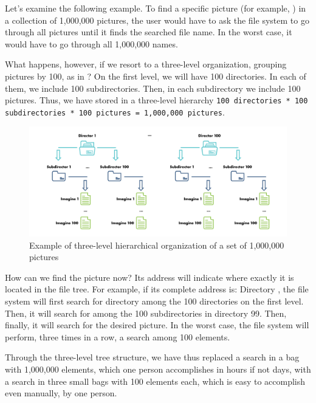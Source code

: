 Let's examine the following example.
To find a specific picture (for example, ) in a collection of 1,000,000 pictures, the user would have to ask the file system to go through all pictures until it finds the searched file name.
In the worst case, it would have to go through all 1,000,000 names.

What happens, however, if we resort to a three-level organization, grouping pictures by 100, as in ? On the first level, we will have 100 directories.
In each of them, we include 100 subdirectories.
Then, in each subdirectory we include 100 pictures.
Thus, we have stored in a three-level hierarchy \texttt{100 directories * 100 subdirectories * 100 pictures = 1,000,000 pictures}.

\begin{figure}[htbp]
  \centering
  \includegraphics[width=\columnwidth]{chapters/03-data-files/img/3-lvl-fs.pdf}
  \caption{Example of three-level hierarchical organization of a set of 1,000,000 pictures}
  \label{fig:data-files:ex-3-lvl}
\end{figure}

How can we find the picture now? Its address will indicate where exactly it is located in the file tree.
For example, if its complete address is: Directory , the file system will first search for directory  among the 100 directories on the first level.
Then, it will search for  among the 100 subdirectories in directory 99.
Then, finally, it will search for the desired picture.
In the worst case, the file system will perform, three times in a row, a search among 100 elements.

Through the three-level tree structure, we have thus replaced a search in a bag with 1,000,000 elements, which one person accomplishes in hours if not days, with a search in three small bags with 100 elements each, which is easy to accomplish even manually, by one person.

